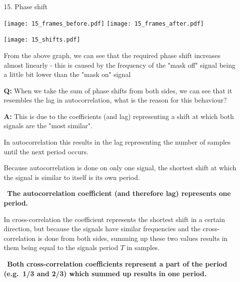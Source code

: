 \documentclass[a4paper, 11pt]{article}
\begin{document}
    \begin{enumerate}
        \item[15.]
        Phase shift

        \texttt{[image: 15\_frames\_before.pdf]}
        \texttt{[image: 15\_frames\_after.pdf]}

        \texttt{[image: 15\_shifts.pdf]}

        From the above graph, we can see that the required phase shift increases almost linearly -
        this is caused by the frequency of the "mask off" signal being a little bit lower than the "mask on" signal

        \vspace{2mm}

        \textbf{Q:} When we take the sum of phase shifts from both sides,
        we can see that it resembles the lag in autocorrelation,
        what is the reason for this behaviour?

        \textbf{A:} This is due to the coefficients (and lag) representing a shift at which both signals are the "most similar".

        In autocorrelation this results in the lag representing the number of samples until the next period occurs.

        Because autocorrelation is done on only one signal,
        the shortest shift at which the signal is similar to itself is its own period.

        \textrightarrow~\textbf{The autocorrelation coefficient (and therefore lag) represents one period.}

        In cross-correlation the coefficient represents the shortest shift in a certain direction,
        but because the signals have similar frequencies and the cross-correlation is done from both sides,
        summing up these two values results in them
        being equal to the signals period $T$ in samples.

        \textrightarrow~\textbf{Both cross-correlation coefficients represent a part of the period (e.g.\ 1/3 and 2/3)
        which summed up results in one period.}
    \end{enumerate}
\end{document}
